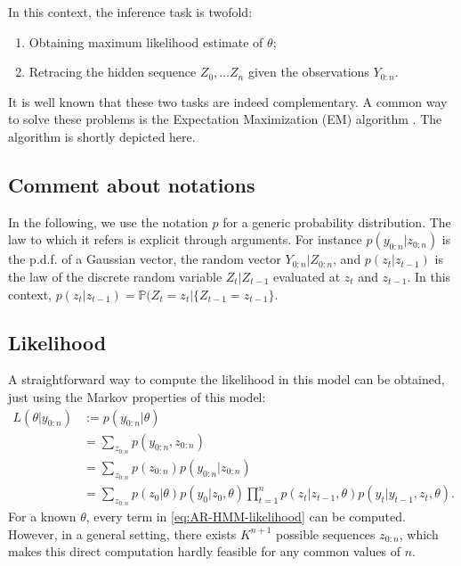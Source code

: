 \documentclass[
]{book}
\providecommand{\tightlist}{%
  \setlength{\itemsep}{0pt}\setlength{\parskip}{0pt}}
\begin{document}
In this context, the inference task is twofold:

\begin{enumerate}
\def\labelenumi{\arabic{enumi}.}
\tightlist
\item
  Obtaining maximum likelihood estimate of \(\theta\);
\item
  Retracing the hidden sequence \(Z_0,\dots Z_n\) given the observations \(Y_{0:n}\).
\end{enumerate}

It is well known that these two tasks are indeed complementary.
A common way to solve these problems is the Expectation Maximization (EM) algorithm
\citep{dempster1977maximum}.
The algorithm is shortly depicted here.

\hypertarget{comment-about-notations}{%
\subsection*{Comment about notations}\label{comment-about-notations}}

In the following, we use the notation \(p\) for a generic probability distribution. The law to which it refers is explicit through arguments. For instance \(p(y_{0:n} \vert z_{0:n})\) is the p.d.f. of a Gaussian vector, the random vector \(Y_{0:n}\vert Z_{0:n}\), and \(p(z_t\vert z_{t - 1})\) is the law of the discrete random variable \(Z_{t} \vert Z_{t - 1}\) evaluated at \(z_t\) and \(z_{t -1}\).
In this context, \(p(z_t\vert z_{t - 1}) = \mathbb{P}(Z_t = z_t \vert \lbrace Z_{t-1} = z_{t -1}\rbrace.\)

\hypertarget{likelihood}{%
\subsection{Likelihood}\label{likelihood}}

A straightforward way to compute the likelihood in this model can be obtained, just using the Markov properties of this model:
\begin{align}
L(\theta \vert y_{0:n}) &:= p(y_{0:n} \vert \theta) \nonumber \\
&= \sum_{z_{0:n}} p(y_{0:n}, z_{0:n}) \nonumber \\
&= \sum_{z_{0:n}} p(z_{0:n})p(y_{0:n}\vert z_{0:n}) \nonumber \\
&=  \sum_{z_{0:n}} p(z_0 \vert \theta) p(y_0\vert z_0, \theta) \prod_{t = 1}^n p(z_{t} \vert z_{t - 1}, \theta)p(y_{t}\vert y_{t -1}, z_{t}, \theta)  \label{eq:AR-HMM-likelihood}.
\end{align}
For a known \(\theta\), every term in \eqref{eq:AR-HMM-likelihood} can be computed.
However, in a general setting, there exists \(K^{n + 1}\) possible sequences \(z_{0:n}\), which makes this direct computation hardly feasible for any common values of \(n\).
\end{document}
